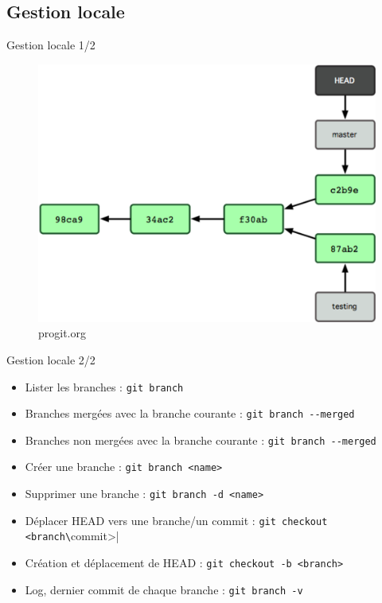 \documentclass{beamer}
\begin{document}
\subsection*{Gestion locale}
\begin{frame}{Gestion locale 1/2}
  \begin{figure}
    \begin{center}
      \includegraphics[scale=0.8]{img/Branch1.png}
    \end{center}
    \caption{progit.org}
  \end{figure}
\end{frame}

\begin{frame}[containsverbatim]{Gestion locale 2/2}
  \begin{itemize}
  \item Lister les branches : \lstinline|git branch|
  \item Branches mergées avec la branche courante : \lstinline|git branch --merged|
  \item Branches non mergées avec la branche courante : \lstinline|git branch --merged|
  \item Créer une branche : \lstinline|git branch <name>|
  \item Supprimer une branche : \lstinline|git branch -d <name>|
  \item Déplacer HEAD vers une branche/un commit : \lstinline|git checkout <branch\|commit>|
  \item Création et déplacement de HEAD : \lstinline|git checkout -b <branch>|
  \item Log, dernier commit de chaque branche : \lstinline|git branch -v|
  \end{itemize}
\end{frame}
\end{document}

